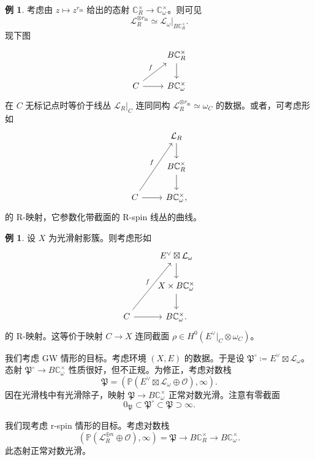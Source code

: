 \documentclass{amsart}
\theoremstyle{definition}
\newtheorem{exm}[thm]{例}
\theoremstyle{remark}
\theoremstyle{plain}
\theoremstyle{definition}
\theoremstyle{remark}
\newcommand{\C}{\mathbb{C}}
\renewcommand{\P}{\mathbb{P}}
\newcommand{\mc}[1]{\mathcal{#1}}
\newcommand{\mf}[1]{\mathfrak{#1}}
\newcommand{\mr}[1]{\mathrm{#1}}
\newcommand{\1}{\mathbf{1}}
\newcommand{\2}{\mathbf{2}}
\newcommand{\3}{\mathbf{3}}
\begin{document}
\begin{exm}
    考虑由 \(z \mapsto z^{r_{\mr{in}}}\) 给出的态射 \(\C^{\times}_R \to \C^{\times}_{\omega}\)。则可见
    \[ \mc{L}_R^{\otimes r_{\mr{in}}} \simeq \mc{L}_{\omega} |_{B \C_R^{\times}}. \]
    现下图
    \begin{equation*}
    \begin{tikzcd}
        & B \C_R^{\times} \ar{d} \\
        C \ar{ur}{f} \ar{r} & B \C_{\omega}^{\times}
    \end{tikzcd}
    \end{equation*}
    在 \(C\) 无标记点时等价于线丛 \(\mc{L}_R|_C\) 连同同构 \(\mc{L}_R^{\otimes r_{\mr{in}}} \simeq \omega_C\) 的数据。或者，可考虑形如
    \begin{equation*}
    \begin{tikzcd}
        & \mc{L}_R \ar{d} \\
        & B \C_R^{\times} \ar{d} \\
        C \ar{uur}{f} \ar{r} & B \C_{\omega}^{\times},
    \end{tikzcd}
    \end{equation*}
    的 R-映射，它参数化带截面的 R-spin 线丛的曲线。
\end{exm}

\begin{exm}
    设 \(X\) 为光滑射影簇。则考虑形如
    \begin{equation*}
    \begin{tikzcd}
        & E^{\vee} \boxtimes \mc{L}_{\omega} \ar{d} \\
        & X \times B \C_{\omega}^{\times} \ar{d} \\
        C \ar{uur}{f} \ar{r} & B \C_{\omega}^{\times}.
    \end{tikzcd}
    \end{equation*}
    的 R-映射。这等价于映射 \(C \to X\) 连同截面 \(\rho \in H^0(E^{\vee}|_C \otimes \omega_C)\)。
\end{exm}

我们考虑 GW 情形的目标。考虑环境 \((X, E)\) 的数据。于是设 \(\mf{P}^{\circ} \coloneqq E^{\vee} \boxtimes \mc{L}_{\omega}\)。态射 \(\mf{P}^{\circ} \to B \C_{\omega}^{\times}\) 性质很好，但不正规。为修正，考虑对数栈
\[ \mf{P} = ( \P(E^{\vee} \boxtimes \mc{L}_{\omega} \oplus \mc{O}) , \infty). \]
因在光滑栈中有光滑除子，映射 \(\mf{P} \to B \C_{\omega}^{\times}\) 正常对数光滑。注意有零截面
\[ 0_{\mf{P}} \subset \mf{P}^{\circ} \subset \mf{P} \supset \infty. \]

我们现考虑 r-spin 情形的目标。考虑对数栈
\[ (\P(\mc{L}_R^{\oplus n} \oplus \mc{O}), \infty) = \mf{P} \to B \C_R^{\times} \to B \C_{\omega}^{\times}. \]
此态射正常对数光滑。
\end{document}

